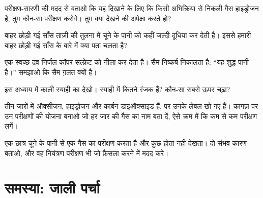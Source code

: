 \begin{exercise}[$\star\star$]\label{exo:g7:identifying-substances:7}
परीक्षण-सारणी की मदद से बताओ कि यह दिखाने के लिए कि किसी अभिक्रिया से निकली
गैस हाइड्रोजन है, तुम कौन-सा परीक्षण करोगे। तुम क्या देखने की अपेक्षा करते हो?
\end{exercise}

\begin{exercise}[$\star\star$]\label{exo:g7:identifying-substances:8}
बाहर छोड़ी गई साँस ताज़ी  की तुलना में चूने के पानी को कहीं जल्दी दूधिया
कर देती है। इससे हमारी बाहर छोड़ी गई साँस के बारे में क्या पता चलता है?
\end{exercise}

\begin{exercise}[$\star\star$]\label{exo:g7:identifying-substances:9}
एक स्वच्छ द्रव निर्जल कॉपर सल्फ़ेट को नीला कर देता है। सैम निष्कर्ष निकालता
है: ``यह शुद्ध पानी है।'' समझाओ कि सैम ग़लत क्यों है।
\end{exercise}

\begin{exercise}[$\star\star$]\label{exo:g7:identifying-substances:10}
इस अध्याय में काली स्याही का  देखो। स्याही में कितने रंजक हैं?
कौन-सा सबसे ऊपर चढ़ा?
\end{exercise}

\begin{exercise}[$\star\star\star$]\label{exo:g7:identifying-substances:11}
तीन जारों में ऑक्सीजन, हाइड्रोजन और कार्बन डाइऑक्साइड हैं, पर उनके लेबल खो
गए हैं। कागज़ पर उन परीक्षणों की योजना बनाओ जो हर जार की गैस का नाम बता दें,
ऐसे क्रम में कि कम से कम परीक्षण लगें।
\end{exercise}

\begin{exercise}[$\star\star\star$]\label{exo:g7:identifying-substances:12}
एक छात्र चूने के पानी से एक गैस का परीक्षण करता है और कुछ होता नहीं देखता।
दो संभव कारण बताओ, और वह नियंत्रण परीक्षण भी जो फ़ैसला करने में मदद करे।
\end{exercise}

\section{समस्या: जाली पर्चा}

